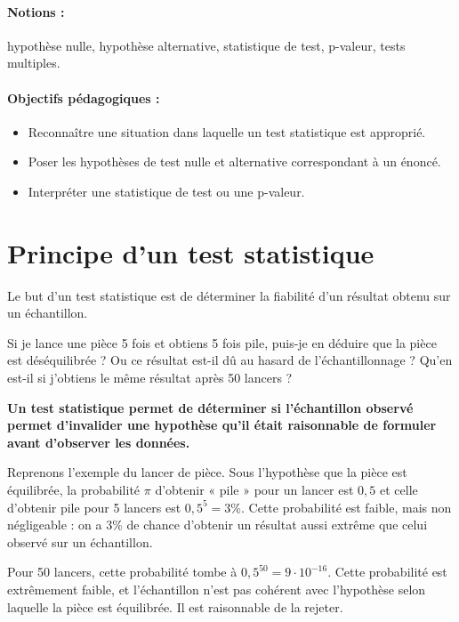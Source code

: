 \label{chap:tests}

\paragraph{Notions :} hypothèse nulle, hypothèse alternative, statistique de
test, p-valeur, tests multiples.
\paragraph{Objectifs pédagogiques :} 
\begin{itemize}      
	\setlength{\itemsep}{3pt}
	\item Reconnaître une situation dans laquelle un test statistique est
	approprié.
	\item Poser les hypothèses de test nulle et alternative correspondant à un
	énoncé.
	\item Interpréter une statistique de test ou une p-valeur.
\end{itemize}


\section{Principe d'un test statistique}
\label{sec:principe_test}
Le but d'un test statistique est de déterminer la fiabilité d'un résultat
obtenu sur un échantillon.

\begin{exemple}
	Si je lance une pièce 5 fois et obtiens 5 fois pile, puis-je en déduire que
	la pièce est déséquilibrée ? Ou ce résultat est-il dû au hasard de
	l'échantillonnage ? Qu'en est-il si j'obtiens le même résultat après 50
	lancers ? 
\end{exemple}

\textbf{Un test statistique permet de déterminer si l'échantillon observé
	permet d'invalider une hypothèse qu'il était raisonnable de formuler avant
	d'observer les données.}

\begin{exemple}
	Reprenons l'exemple du lancer de pièce. Sous l'hypothèse que la pièce est
	équilibrée, la probabilité $\pi$ d'obtenir « pile » pour un lancer est $0,5$
	et celle d'obtenir pile pour 5 lancers est $0,5^5 = 3\%.$ Cette probabilité
	est faible, mais non négligeable : on a 3\% de chance d'obtenir un résultat
	aussi extrême que celui observé sur un échantillon.
	
	Pour 50 lancers, cette probabilité tombe à $0,5^{50} = 9 \cdot 10^{-16}.$
	Cette probabilité est extrêmement faible, et l'échantillon n'est pas cohérent
	avec l'hypothèse selon laquelle la pièce est équilibrée. Il est raisonnable
	de la rejeter.
\end{exemple}

